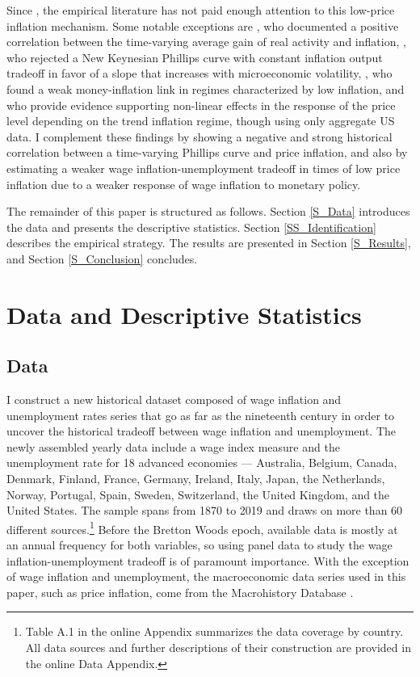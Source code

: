 \documentclass[12pt]{article}
\begin{document}
Since \cite{Ball1988}, the empirical literature has not paid enough attention to this low-price inflation mechanism. Some notable exceptions are \cite{Benati2007}, who documented a positive correlation between the time-varying average gain of real activity and inflation, \cite{Vavra2014B}, who rejected a New Keynesian Phillips curve with constant inflation output tradeoff in favor of a slope that increases with microeconomic volatility, \cite{Gertler2018}, who found a weak money-inflation link in regimes characterized by low inflation, and \cite{Ascari2021, Ascari2022} who provide evidence supporting non-linear effects in the response of the price level depending on the trend inflation regime, though using only aggregate US data. I complement these findings by showing a negative and strong historical correlation between a time-varying Phillips curve and price inflation, and also by estimating a weaker wage inflation-unemployment tradeoff in times of low price inflation due to a weaker response of wage inflation to monetary policy.

The remainder of this paper is structured as follows. Section \ref{S_Data} introduces the data and presents the descriptive statistics. Section \ref{SS_Identification} describes the empirical strategy. The results are presented in Section \ref{S_Results}, and Section \ref{S_Conclusion} concludes.


\section{Data and Descriptive Statistics \label{S_Data}}
\subsection{Data}

I construct a new historical dataset composed of wage inflation and unemployment rates series that go as far as the nineteenth century in order to uncover the historical tradeoff between wage inflation and unemployment. The newly assembled yearly data include a wage index measure and the unemployment rate for 18 advanced economies — Australia, Belgium, Canada, Denmark, Finland, France, Germany, Ireland, Italy, Japan, the Netherlands, Norway, Portugal, Spain, Sweden, Switzerland, the United Kingdom, and the United States. The sample spans from 1870 to 2019 and draws on more than 60 different sources.\footnote{Table A.1 in the online Appendix summarizes the data coverage by country. All data sources and further descriptions of their construction are provided in the online Data Appendix.} Before the Bretton Woods epoch, available data is mostly at an annual frequency for both variables, so using panel data to study the wage inflation-unemployment tradeoff is of paramount importance. With the exception of wage inflation and unemployment, the macroeconomic data series used in this paper, such as price inflation, come from the Macrohistory Database \citep{Jorda2017}.
\end{document}
